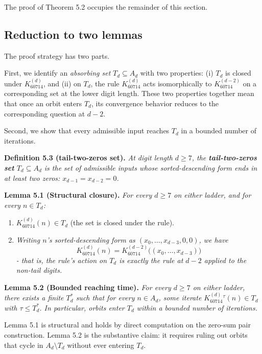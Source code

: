 \documentclass[11pt,letterpaper]{article}
\providecommand{\tightlist}{%
  \setlength{\itemsep}{0pt}\setlength{\parskip}{0pt}}
\theoremstyle{paperstyle}
\theoremstyle{paperstyledef}
\theoremstyle{paperstylerem}
\begin{document}
The proof of Theorem 5.2 occupies the remainder of this section.

\hypertarget{reduction-to-two-lemmas}{%
\subsection{Reduction to two lemmas}\label{reduction-to-two-lemmas}}

The proof strategy has two parts.

First, we identify an \emph{absorbing set} \(T_d \subseteq A_d\) with
two properties: (i) \(T_d\) is closed under \(K_{60714}^{(d)}\), and
(ii) on \(T_d\), the rule \(K_{60714}^{(d)}\) acts isomorphically to
\(K_{60714}^{(d-2)}\) on a corresponding set at the lower digit length.
These two properties together mean that once an orbit enters \(T_d\),
its convergence behavior reduces to the corresponding question at
\(d - 2\).

Second, we show that every admissible input reaches \(T_d\) in a bounded
number of iterations.

\textbf{Definition 5.3 (tail-two-zeros set).} \emph{At digit length
\(d \geq 7\), the \textbf{tail-two-zeros set} \(T_d \subseteq A_d\) is
the set of admissible inputs whose sorted-descending form ends in at
least two zeros: \(x_{d-1} = x_{d-2} = 0\).}

\textbf{Lemma 5.1 (Structural closure).} \emph{For every \(d \geq 7\) on
either ladder, and for every \(n \in T_d\):}

\begin{enumerate}
\def\labelenumi{\arabic{enumi}.}
\tightlist
\item
  \(K_{60714}^{(d)}(n) \in T_d\) (the set is closed under the rule).
\item
  \emph{Writing \(n\)'s sorted-descending form as
  \((x_0, \ldots, x_{d-3}, 0, 0)\), we have}
  \[K_{60714}^{(d)}(n) = K_{60714}^{(d-2)}\bigl((x_0, \ldots, x_{d-3})\bigr)\]
  \emph{ - that is, the rule's action on \(T_d\) is exactly the rule at
  \(d - 2\) applied to the non-tail digits.}
\end{enumerate}

\textbf{Lemma 5.2 (Bounded reaching time).} \emph{For every \(d \geq 7\)
on either ladder, there exists a finite \(T_d^*\) such that for every
\(n \in A_d\), some iterate \(K_{60714}^{(d)}{}^{\tau}(n) \in T_d\) with
\(\tau \leq T_d^*\). In particular, orbits enter \(T_d\) within a
bounded number of iterations.}

Lemma 5.1 is structural and holds by direct computation on the zero-sum
pair construction. Lemma 5.2 is the substantive claim: it requires
ruling out orbits that cycle in \(A_d \setminus T_d\) without ever
entering \(T_d\).
\end{document}
